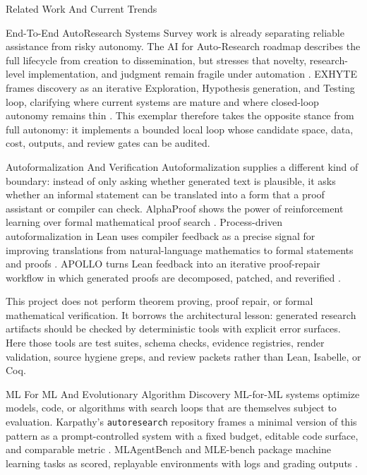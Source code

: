 \documentclass[
  ignorenonframetext,
]{beamer}
\begin{document}
\begin{frame}{Related Work And Current Trends}
\begin{block}{End-To-End AutoResearch Systems}
Survey work is already separating reliable assistance from risky
autonomy. The AI for Auto-Research roadmap describes the full lifecycle
from creation to dissemination, but stresses that novelty,
research-level implementation, and judgment remain fragile under
automation . EXHYTE frames
discovery as an iterative Exploration, Hypothesis generation, and
Testing loop, clarifying where current systems are mature and where
closed-loop autonomy remains thin . This
exemplar therefore takes the opposite stance from full autonomy: it
implements a bounded local loop whose candidate space, data, cost,
outputs, and review gates can be audited.
\end{block}

\begin{block}{Autoformalization And Verification}
\protect{}\label{sec:autoformalization-verification}
Autoformalization supplies a different kind of boundary: instead of only
asking whether generated text is plausible, it asks whether an informal
statement can be translated into a form that a proof assistant or
compiler can check. AlphaProof shows the power of reinforcement learning
over formal mathematical proof search .
Process-driven autoformalization in Lean uses compiler feedback as a
precise signal for improving translations from natural-language
mathematics to formal statements and proofs
. APOLLO turns Lean
feedback into an iterative proof-repair workflow in which generated
proofs are decomposed, patched, and reverified
.

This project does not perform theorem proving, proof repair, or formal
mathematical verification. It borrows the architectural lesson:
generated research artifacts should be checked by deterministic tools
with explicit error surfaces. Here those tools are test suites, schema
checks, evidence registries, render validation, source hygiene greps,
and review packets rather than Lean, Isabelle, or Coq.
\end{block}

\begin{block}{ML For ML And Evolutionary Algorithm Discovery}
\protect{}\label{sec:ml-for-ml-evolutionary-discovery}
ML-for-ML systems optimize models, code, or algorithms with search loops
that are themselves subject to evaluation. Karpathy's
\texttt{autoresearch} repository frames a minimal version of this
pattern as a prompt-controlled system with a fixed budget, editable code
surface, and comparable metric .
MLAgentBench and MLE-bench package machine learning tasks as scored,
replayable environments with logs and grading outputs
.


\end{block}
\end{frame}
\end{document}
